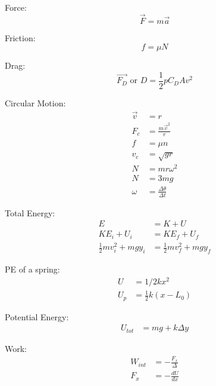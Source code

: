 \documentclass[10pt, letterpaper]{book}
\begin{document}
\begin{multicols*}{2}
        Force:
        \begin{equation}
            \vec{F} = m\vec{a}
        \end{equation}

        Friction:
        \begin{equation}
            f = \mu N
        \end{equation}

        Drag: 
        \begin{equation}
            \vec{F_D}\text{ or }D = \frac{1}{2}p C_{D}Av^{2}
        \end{equation}

        Circular Motion:
        \begin{align}
            \vec{v}         & = r                               \\
            F_{c}           & =\frac{m\vec{v}^{2}}{r}           \\
            f               & = \mu n                           \\
            v_{c}           & = \sqrt{gr}                       \\
            N               & = mr\omega^{2}                    \\
            N               & = 3mg                             \\
            \omega          & = \frac{\Delta \theta}{\Delta t}  
        \end{align}

        Total Energy:
        \begin{align}
            E   & = K + U   \\
            KE_{i} + U_{i}  & = KE_{f} + U_{f}  \\
            \frac{1}{2}mv^{2}_{i} + mgy_{i} & = \frac{1}{2}mv^{2}_{f} + mgy_{f}
        \end{align}

        PE of a spring:
        \begin{align}
            U     & = 1/2kx^{2}                 \\
            U_{p} & = \frac{1}{2}k(x-L_{0})
        \end{align}

        Potential Energy:
        \begin{align}
            U_{tot} & = mg + k\Delta y 
        \end{align}

        Work:
        \begin{align}
            W_{int} & = -\frac{F_{x}}{\Delta }   \\
            F_{x}   & = -\frac{dU}{dx}
        \end{align} 


\end{multicols*}
\end{document}

